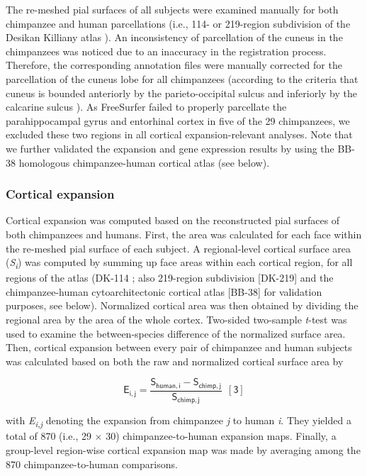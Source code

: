 \begin{refsection}
The re-meshed pial surfaces of all subjects were examined manually for both chimpanzee and human parcellations (i.e., 114- or 219-region subdivision of the Desikan Killiany atlas \citep{DESIKAN2006968,CAMMOUN2012386}). An inconsistency of parcellation of the cuneus in the chimpanzees was noticed due to an inaccuracy in the registration process. Therefore, the corresponding annotation files were manually corrected for the parcellation of the cuneus lobe for all chimpanzees (according to the criteria that cuneus is bounded anteriorly by the parieto-occipital sulcus and inferiorly by the calcarine sulcus \citep{Scholtens2015ECONOMO}). As FreeSurfer failed to properly parcellate the parahippocampal gyrus and entorhinal cortex in five of the 29 chimpanzees, we excluded these two regions in all cortical expansion-relevant analyses. Note that we further validated the expansion and gene expression results by using the BB-38 homologous chimpanzee-human cortical atlas \citep{Heuvel2019EvolutionaryMI} (see below).

\subsubsection*{Cortical expansion}
Cortical expansion was computed based on the reconstructed pial surfaces of both chimpanzees and humans. First, the area was calculated for each face within the re-meshed pial surface of each subject. A regional-level cortical surface area (\textit{S\textsubscript{i}}) was computed by summing up face areas within each cortical region, for all regions of the atlas (DK-114 \citep{CAMMOUN2012386,DESIKAN2006968}; also 219-region subdivision [DK-219] and the chimpanzee-human cytoarchitectonic cortical atlas [BB-38] for validation purposes, see below). Normalized cortical area was then obtained by dividing the regional area by the area of the whole cortex. Two-sided two-sample \textit{t}-test was used to examine the between-species difference of the normalized surface area. Then, cortical expansion between every pair of chimpanzee and human subjects was calculated based on both the raw and normalized cortical surface area by

\[\mathsf{ E_{i,j}=\frac{S_{human,i}-S_{chimp,j}}{S_{chimp,j}} \ \ [3] }\]

\noindent
with \textit{E\textsubscript{i,j} }denoting the expansion from chimpanzee \textit{j} to human \textit{i}. They yielded a total of 870 (i.e., 29 $ \times $  30) chimpanzee-to-human expansion maps. Finally, a group-level region-wise cortical expansion map was made by averaging among the 870 chimpanzee-to-human comparisons.


\end{refsection}
